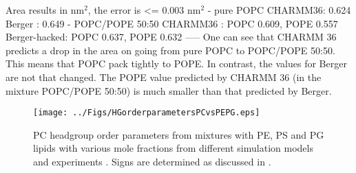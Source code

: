 \documentclass[aps,prl,superscriptaddress,twocolumn]{revtex4}
\begin{document}
Area results in nm$^2$, the error is <= 0.003 nm$^2$
- pure POPC
CHARMM36: 0.624
Berger : 0.649
- POPC/POPE 50:50
CHARMM36 : POPC 0.609, POPE 0.557
Berger-hacked: POPC 0.637, POPE 0.632
-----
One can see that CHARMM 36 predicts a drop in the area on going from pure POPC to POPC/POPE 50:50. This means that POPC pack tightly to POPE.
In contrast, the values for Berger are not that changed.
The POPE value predicted by CHARMM 36 (in the mixture POPC/POPE 50:50) is much smaller than that predicted by Berger.

\begin{figure*}[]
  \centering
  \texttt{[image: ../Figs/HGorderparametersPCvsPEPG.eps]}
  \caption{\label{HGorderparametersPCvsPEPSPG}
    PC headgroup order parameters from mixtures with PE, PS and PG
    lipids with various mole fractions from different simulation models and experiments \cite{scherer87}.
    Signs are determined as discussed in \cite{botan15,ollila16}.
  }
\end{figure*}

\end{document}
